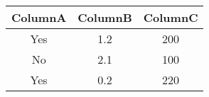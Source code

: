 \documentclass[class=article, crop=false]{standalone}
\begin{document}
\begin{center}
\begin{tabular}{ |c|c|c| }
 \hline
 ColumnA & ColumnB & ColumnC \\
 \hline
 Yes & 1.2 & 200 \\
 \hline
 No & 2.1 & 100 \\
 \hline
 Yes & 0.2 & 220 \\
 \hline
\end{tabular}
\end{center}
\end{document}

